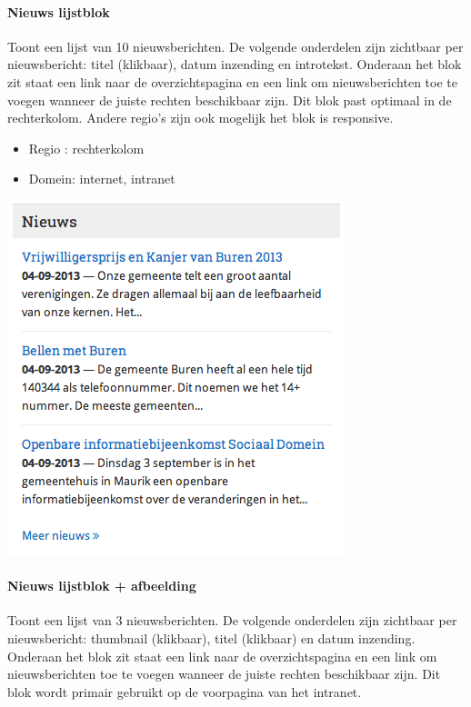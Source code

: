 \paragraph{Nieuws lijstblok}

Toont een lijst van 10 nieuwsberichten. De volgende onderdelen zijn zichtbaar per nieuwsbericht: titel (klikbaar), datum inzending en introtekst. Onderaan het blok zit staat een link naar de overzichtspagina en een link om nieuwsberichten toe te voegen wanneer de juiste rechten beschikbaar zijn. Dit blok past optimaal in de rechterkolom. Andere regio's zijn ook mogelijk het blok is responsive.

\begin{itemize}
\item Regio : rechterkolom
\item Domein: internet, intranet
\end{itemize}

\begin{center}
	\includegraphics[scale=0.5]{img/blokken/nieuwslist.png}
\end{center}

\paragraph{Nieuws lijstblok + afbeelding}

Toont een lijst van 3 nieuwsberichten. De volgende onderdelen zijn zichtbaar per nieuwsbericht: thumbnail (klikbaar), titel (klikbaar) en datum inzending. Onderaan het blok zit staat een link naar de overzichtspagina en een link om nieuwsberichten toe te voegen wanneer de juiste rechten beschikbaar zijn. Dit blok wordt primair gebruikt op de voorpagina van het intranet.

